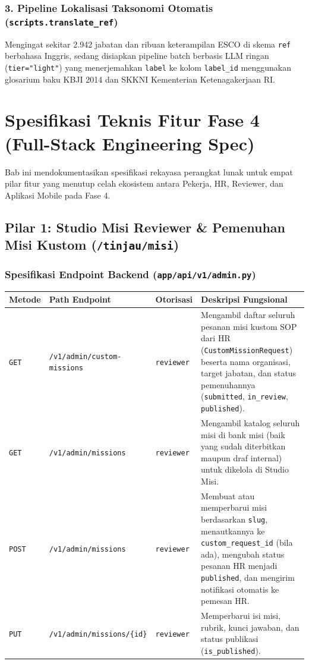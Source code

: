 \documentclass[11pt,a4paper]{report}
\begin{document}
\subsection{3. Pipeline Lokalisasi Taksonomi Otomatis (\texttt{scripts.translate\_ref})}
Mengingat sekitar 2.942 jabatan dan ribuan keterampilan ESCO di skema \texttt{ref} berbahasa Inggris, sedang disiapkan pipeline batch berbasis LLM ringan (\texttt{tier="light"}) yang menerjemahkan \texttt{label} ke kolom \texttt{label\_id} menggunakan glosarium baku KBJI 2014 dan SKKNI Kementerian Ketenagakerjaan RI.

\chapter{Spesifikasi Teknis Fitur Fase 4 (Full-Stack Engineering Spec)}

Bab ini mendokumentasikan spesifikasi rekayasa perangkat lunak untuk empat pilar fitur yang menutup celah ekosistem antara Pekerja, HR, Reviewer, dan Aplikasi Mobile pada Fase 4.

\section{Pilar 1: Studio Misi Reviewer \& Pemenuhan Misi Kustom (\texttt{/tinjau/misi})}

\subsection{Spesifikasi Endpoint Backend (\texttt{app/api/v1/admin.py})}
\renewcommand{\arraystretch}{1.3}
\begin{tabularx}{\textwidth}{L{2.0cm} L{5.2cm} L{2.4cm} X}
\toprule
\textbf{Metode} & \textbf{Path Endpoint} & \textbf{Otorisasi} & \textbf{Deskripsi Fungsional} \\
\midrule
\texttt{GET} & \texttt{/v1/admin/custom-missions} & \texttt{reviewer} & Mengambil daftar seluruh pesanan misi kustom SOP dari HR (\texttt{CustomMissionRequest}) beserta nama organisasi, target jabatan, dan status pemenuhannya (\texttt{submitted}, \texttt{in\_review}, \texttt{published}). \\
\texttt{GET} & \texttt{/v1/admin/missions} & \texttt{reviewer} & Mengambil katalog seluruh misi di bank misi (baik yang sudah diterbitkan maupun draf internal) untuk dikelola di Studio Misi. \\
\texttt{POST} & \texttt{/v1/admin/missions} & \texttt{reviewer} & Membuat atau memperbarui misi berdasarkan \texttt{slug}, menautkannya ke \texttt{custom\_request\_id} (bila ada), mengubah status pesanan HR menjadi \texttt{published}, dan mengirim notifikasi otomatis ke pemesan HR. \\
\texttt{PUT} & \texttt{/v1/admin/missions/\{id\}} & \texttt{reviewer} & Memperbarui isi misi, rubrik, kunci jawaban, dan status publikasi (\texttt{is\_published}). \\
\bottomrule
\end{tabularx}
\end{document}
